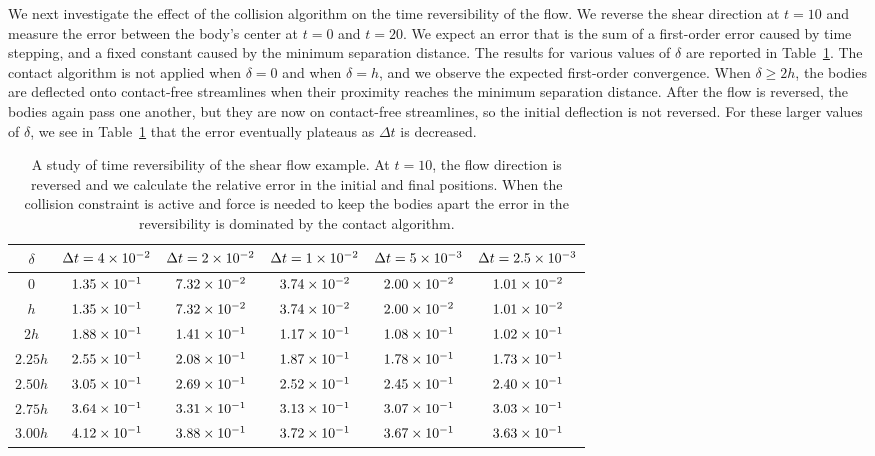 \documentclass[AMA,STIX1COL]{WileyNJD-v2}
\begin{document}
We next investigate the effect of the collision algorithm on the time
reversibility of the flow. We reverse the shear direction at $t=10$ and
measure the error between the body's center at $t=0$ and $t=20$.  We
expect an error that is the sum of a first-order error caused by time
stepping, and a fixed constant caused by the minimum separation
distance.  The results for various values of $\delta$ are reported in
Table~\ref{tab:reverse}. The contact algorithm is not applied
when $\delta=0$ and when $\delta=h$, and we observe the expected
first-order convergence.  When $\delta \geq 2h$, the bodies are
deflected onto contact-free streamlines when their proximity reaches the
minimum separation distance.  After the flow is reversed, the bodies
again pass one another, but they are now on contact-free streamlines, so
the initial deflection is not reversed.  For these larger values of
$\delta$, we see in Table~\ref{tab:reverse} that the error eventually
plateaus as $\Delta t$ is decreased.

\begin{table}[t]
\caption{A study of time reversibility of the shear flow example. At
  $t=10$, the flow direction is reversed and we calculate the relative
  error in the initial and final positions. When the collision
  constraint is active and force is needed to keep the bodies apart the
  error in the reversibility is dominated by the contact
algorithm.\label{tab:reverse}}
  \centering
  \begin{tabular*}{500pt}{@{\extracolsep\fill}c| c c c c c@{\extracolsep\fill}}
    \toprule
    $\delta$ & $\Delta t = 4\times 10^{-2}$ &$\Delta t = 2\times 10^{-2}$ &$\Delta t =
    1\times 10^{-2}$ &$\Delta t = 5\times 10^{-3}$ &$\Delta t = 2.5\times 10^{-3}$\\
    \midrule
    0 & $1.35\times 10^{-1}$ & $7.32\times 10^{-2}$ & $3.74\times 10^{-2}$ & $2.00\times 10^{-2}$ & $1.01\times 10^{-2}$\\
    $h$ & $1.35\times 10^{-1}$ & $7.32\times 10^{-2}$ & $3.74\times 10^{-2}$ & $2.00\times 10^{-2}$ & $1.01\times 10^{-2}$\\
    $2h$ & $1.88\times 10^{-1}$ & $1.41\times 10^{-1}$ & $1.17\times 10^{-1}$ & $1.08\times 10^{-1}$ &
    $1.02\times 10^{-1}$\\
    $2.25h$ & $2.55\times 10^{-1}$ & $2.08\times 10^{-1}$ & $1.87\times 10^{-1}$ & $1.78\times 10^{-1}$ &
    $1.73\times 10^{-1}$\\
    $2.50h$ & $3.05\times 10^{-1}$ & $2.69\times 10^{-1}$ & $2.52\times 10^{-1}$ & $2.45\times 10^{-1}$ &
    $2.40\times 10^{-1}$\\
    $2.75h$ & $3.64\times 10^{-1}$ & $3.31\times 10^{-1}$ & $3.13\times 10^{-1}$ & $3.07\times 10^{-1}$ &
    $3.03\times 10^{-1}$\\
    $3.00h$ & $4.12\times 10^{-1}$ & $3.88\times 10^{-1}$ & $3.72\times 10^{-1}$ & $3.67\times 10^{-1}$ &
    $3.63\times 10^{-1}$ \\
    \bottomrule
  \end{tabular*}
\end{table}
\end{document}
